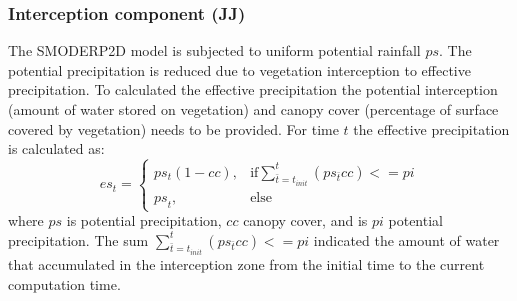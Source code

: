
        \subsubsection{Interception component (JJ)}
            The SMODERP2D model is subjected to uniform potential rainfall
            $ps$.  The potential precipitation is reduced due to vegetation
            interception to effective precipitation.  To calculated the
            effective  precipitation the potential interception (amount of
            water stored on vegetation) and canopy cover (percentage of surface
            covered by vegetation) needs to be provided.  For time $t$ the
            effective precipitation is calculated as:
            $$
            es_t= 
              \begin{cases}
              ps_t(1 - cc),& \text{if} \sum_{\bar{t} = t_{init}}^{t} (ps_{\bar{t}} cc) <= pi\\
              {ps}_t,             & \text{else}
            \end{cases}
            $$
            where $ps$ is potential precipitation, $cc$ canopy cover, and is
            $pi$ potential precipitation.  The sum $\sum_{\bar{t} =
            t_{init}}^{t} (ps_{\bar{t}} cc) <= pi$ indicated the amount of
            water that accumulated in the interception zone from the initial
            time to the current computation time.
            
